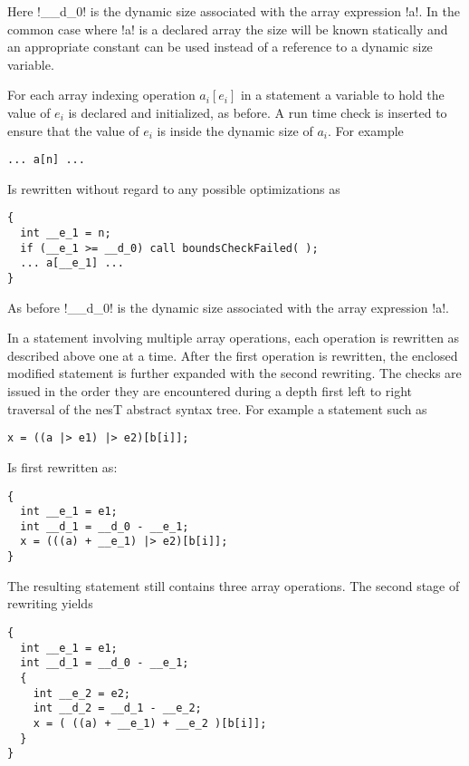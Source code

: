 Here !__d_0! is the dynamic size associated with the array expression !a!. In the common case
where !a! is a declared array the size will be known statically and an appropriate constant can
be used instead of a reference to a dynamic size variable.

For each array indexing operation $a_i[e_i]$ in a statement a variable to hold the value of
$e_i$ is declared and initialized, as before. A run time check is inserted to ensure that the
value of $e_i$ is inside the dynamic size of $a_i$. For example

\singlespace
\begin{lstlisting}[language=nesC]
... a[n] ...
\end{lstlisting}
\primaryspacing

Is rewritten without regard to any possible optimizations as

\singlespace
\begin{lstlisting}[language=nesC]
{
  int __e_1 = n;
  if (__e_1 >= __d_0) call boundsCheckFailed( );
  ... a[__e_1] ...
}
\end{lstlisting}
\primaryspacing

As before !__d_0! is the dynamic size associated with the array expression !a!.

In a statement involving multiple array operations, each operation is rewritten as described
above one at a time. After the first operation is rewritten, the enclosed modified statement is
further expanded with the second rewriting. The checks are issued in the order they are
encountered during a depth first left to right traversal of the nesT abstract syntax tree. For
example a statement such as

\singlespace
\begin{lstlisting}[language=nesC]
x = ((a |> e1) |> e2)[b[i]];
\end{lstlisting}
\primaryspacing

Is first rewritten as:

\singlespace
\begin{lstlisting}[language=nesC]
{
  int __e_1 = e1;
  int __d_1 = __d_0 - __e_1;
  x = (((a) + __e_1) |> e2)[b[i]];
}
\end{lstlisting}
\primaryspacing

The resulting statement still contains three array operations. The second stage of rewriting
yields

\singlespace
\begin{lstlisting}[language=nesC]
{
  int __e_1 = e1;
  int __d_1 = __d_0 - __e_1;
  {
    int __e_2 = e2;
    int __d_2 = __d_1 - __e_2;
    x = ( ((a) + __e_1) + __e_2 )[b[i]];
  }
}
\end{lstlisting}
\primaryspacing

